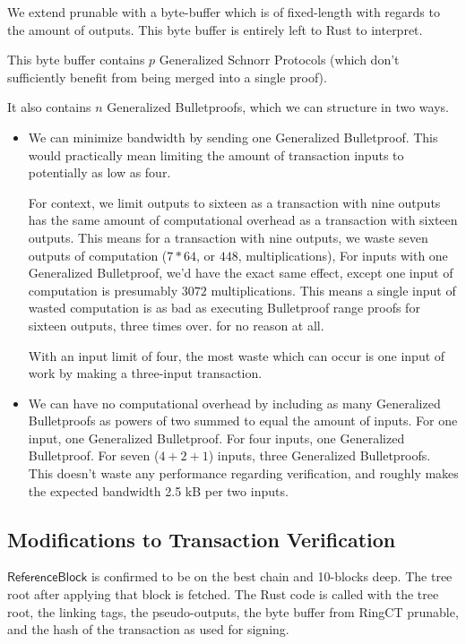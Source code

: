 \documentclass[]{article}
\begin{document}
We extend prunable with a byte-buffer which is of fixed-length with regards to the amount of outputs. This byte buffer is entirely left to Rust to interpret.

This byte buffer contains $p$ Generalized Schnorr Protocols (which don't sufficiently benefit from being merged into a single proof).

It also contains $n$ Generalized Bulletproofs, which we can structure in two ways.

\begin{itemize}
	\item
	We can minimize bandwidth by sending one Generalized Bulletproof. This would practically mean limiting the amount of transaction inputs to potentially as low as four.
	
	For context, we limit outputs to sixteen as a transaction with nine outputs has the same amount of computational overhead as a transaction with sixteen outputs. This means for a transaction with nine outputs, we waste seven outputs of computation ($7 * 64$, or $448$, multiplications), For inputs with one Generalized Bulletproof, we'd have the exact same effect, except one input of computation is presumably $3072$ multiplications. This means a single input of wasted computation is as bad as executing Bulletproof range proofs for sixteen outputs, three times over. for no reason at all.
	
	With an input limit of four, the most waste which can occur is one input of work by making a three-input transaction.
	\item
	We can have no computational overhead by including as many Generalized Bulletproofs as powers of two summed to equal the amount of inputs. For one input, one Generalized Bulletproof. For four inputs, one Generalized Bulletproof. For seven ($4 + 2 + 1$) inputs, three Generalized Bulletproofs. This doesn't waste any performance regarding verification, and roughly makes the expected bandwidth 2.5 kB per two inputs.
\end{itemize}

\subsection{Modifications to Transaction Verification}

$\mathsf{ReferenceBlock}$ is confirmed to be on the best chain and 10-blocks deep. The tree root after applying that block is fetched. The Rust code is called with the tree root, the linking tags, the pseudo-outputs, the byte buffer from RingCT prunable, and the hash of the transaction as used for signing.
\end{document}
